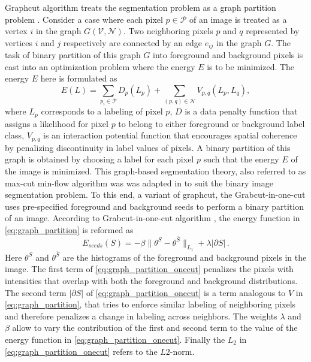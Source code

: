 \documentclass {udthesis}
\begin{document}
Graphcut algorithm treats the segmentation problem as a graph partition problem \cite{mincut_maxflow}. Consider a case where each pixel $p \in \mathcal{P}$ of an image is treated as a vertex $i$ in the graph $G(\mathcal{V},\mathcal{N})$. Two neighboring pixels $p$ and $q$ represented by vertices $i$ and $j$ respectively are connected by an edge $e_{ij}$ in the graph $G$. The task of binary partition of this graph $G$ into foreground and background pixels is cast into an optimization problem where the energy $E$ is to be minimized. The energy $E$ here is formulated as 
%
\begin{equation}	\label{eq:graph_partition}
  E(L)=\sum\limits_{p_i\in \mathcal{P}} D_p(L_p)+\sum\limits_{(p,q)\in \mathcal{N}} V_{p,q} (L_p,L_q),
\end{equation}
%
where $L_p$ corresponds to a labeling of pixel $p$, $D$ is a data penalty function that assigns a likelihood for pixel $p$ to belong to either foreground or background label class, $V_{p,q}$ is an interaction potential function that encourages spatial coherence by penalizing discontinuity in label values of pixels. A binary partition of this graph is obtained by choosing a label for each pixel $p$ such that the energy $E$ of the image is minimized. This graph-based segmentation theory, also referred to as max-cut min-flow algorithm was was adapted in \cite{onecut} to suit the binary image segmentation problem. To this end, a variant of graphcut, the Grabcut-in-one-cut \cite{onecut} uses pre-specified foreground and background seeds to perform a binary partition of an image. According to Grabcut-in-one-cut algorithm \cite{onecut}, the energy function in \eqref{eq:graph_partition} is reformed as
%
\begin{equation} \label{eq:graph_partition_onecut}
  E_{seeds}(S)=-\beta \| \theta^S-\theta^{\bar{S}} \|_{L_1}+\lambda|\partial S|\,.
\end{equation}
%
Here $\theta^S$ and $\theta^{\bar{S}}$ are the histograms of the foreground and background pixels in the image. The first term of \eqref{eq:graph_partition_onecut} penalizes the pixels with intensities that overlap with both the foreground and background distributions. The second term $|\partial S|$ of \eqref{eq:graph_partition_onecut} is a term analogous to $V$ in \eqref{eq:graph_partition}, that tries to enforce similar labeling of neighboring pixels and therefore penalizes a change in labeling across neighbors. The weights $\lambda$ and $\beta$ allow to vary the contribution of the first and second term to the value of the energy function in \eqref{eq:graph_partition_onecut}. Finally the $L_2$ in \eqref{eq:graph_partition_onecut} refers to the $L2$-norm.
\end{document}
